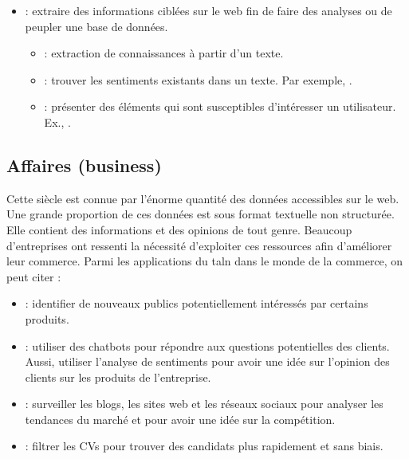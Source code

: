 \documentclass{KodeBook}
\begin{document}
\begin{itemize}
	\item {} : extraire des informations ciblées sur le web fin de faire des analyses ou de peupler une base de données.
	\begin{itemize}
		\item {} : extraction de connaissances à partir d'un texte.
		\item {} : trouver les sentiments existants dans un texte. Par exemple, .
		\item {} : présenter des éléments qui sont susceptibles d'intéresser un utilisateur. Ex., .
	\end{itemize}
\end{itemize}


\subsection{Affaires (business)}

Cette siècle est connue par l'énorme quantité des données accessibles sur le web. 
Une grande proportion de ces données est sous format textuelle non structurée.
Elle contient des informations et des opinions de tout genre. 
Beaucoup d'entreprises ont ressenti la nécessité d'exploiter ces ressources afin d'améliorer leur commerce. 
Parmi les applications du \ac{taln} dans le monde de la commerce, on peut citer :
\begin{itemize}
	\item {} : identifier de nouveaux publics potentiellement intéressés par certains produits.
	\item {} : utiliser des chatbots pour répondre aux questions potentielles des clients. Aussi, utiliser l'analyse de sentiments pour avoir une idée sur l'opinion des clients sur les produits de l'entreprise.
	\item {} : surveiller les blogs, les sites web et les réseaux sociaux pour analyser les tendances du marché et pour avoir une idée sur la compétition.
	\item {} : filtrer les CVs pour trouver des candidats plus rapidement et sans biais.
\end{itemize}
\end{document}
